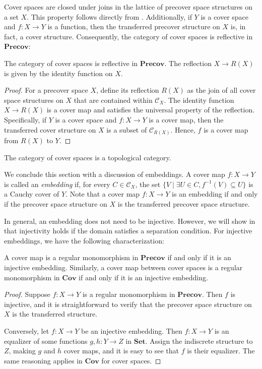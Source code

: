 \documentclass[pdflatex,sn-mathphys-num]{sn-jnl}
\theoremstyle{definition}
\theoremstyle{remark}
\numberwithin{figure}{section}
\newcommand{\cat}[1]{\mathbf{#1}}
\begin{document}
Cover spaces are closed under joins in the lattice of precover space structures on a set $X$.
This property follows directly from .
Additionally, if $Y$ is a cover space and $f : X \to Y$ is a function, then the transferred precover structure on $X$ is, in fact, a cover structure.
Consequently, the category of cover spaces is reflective in $\cat{Precov}$:

\begin{prop}
The category of cover spaces is reflective in $\cat{Precov}$.
The reflection $X \to R(X)$ is given by the identity function on $X$.
\end{prop}
\begin{proof}
For a precover space $X$, define its reflection $R(X)$ as the join of all cover space structures on $X$ that are contained within $\mathcal{C}_X$.
The identity function $X \to R(X)$ is a cover map and satisfies the universal property of the reflection.
Specifically, if $Y$ is a cover space and $f : X \to Y$ is a cover map, then the transferred cover structure on $X$ is a subset of $\mathcal{C}_{R(X)}$.
Hence, $f$ is a cover map from $R(X)$ to $Y$.
\end{proof}

\begin{cor}
The category of cover spaces is a topological category.
\end{cor}

We conclude this section with a discussion of embeddings.
A cover map $f : X \to Y$ is called an \emph{embedding} if, for every $C \in \mathcal{C}_X$,
the set $\{ V \mid \exists U \in C, f^{-1}(V) \subseteq U \}$ is a Cauchy cover of $Y$.
Note that a cover map $f : X \to Y$ is an embedding if and only if the precover space structure on $X$ is the transferred precover space structure.

In general, an embedding does not need to be injective.
However, we will show in  that injectivity holds if the domain satisfies a separation condition.
For injective embeddings, we have the following characterization:

\begin{prop}
A cover map is a regular monomorphism in $\cat{Precov}$ if and only if it is an injective embedding.
Similarly, a cover map between cover spaces is a regular monomorphism in $\cat{Cov}$ if and only if it is an injective embedding.
\end{prop}
\begin{proof}
Suppose $f : X \to Y$ is a regular monomorphism in $\cat{Precov}$.
Then $f$ is injective, and it is straightforward to verify that the precover space structure on $X$ is the transferred structure.

Conversely, let $f : X \to Y$ be an injective embedding.
Then $f : X \to Y$ is an equalizer of some functions $g,h : Y \to Z$ in $\cat{Set}$.
Assign the indiscrete structure to $Z$, making $g$ and $h$ cover maps, and it is easy to see that $f$ is their equalizer.
The same reasoning applies in $\cat{Cov}$ for cover spaces.
\end{proof}
\end{document}
